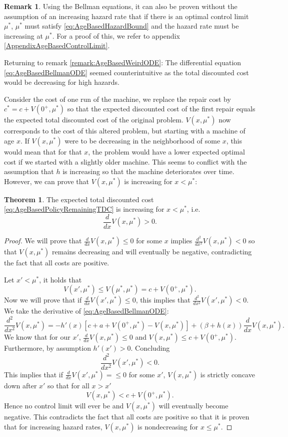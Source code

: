 \documentclass[a4paper]{thesis}
\theoremstyle{definition}
\newtheorem{remark}{Remark}[chapter]
\newtheorem{theorem}{Theorem}[section]
\begin{document}
\begin{remark}
	Using the Bellman equations, it can also be proven without the assumption of an increasing hazard rate that if there is an optimal control limit $\mu^*$, $\mu^*$ must satisfy \eqref{eq:AgeBasedHazardBound} and the hazard rate must be increasing at $\mu^*$.
	For a proof of this, we refer to appendix \ref{AppendixAgeBasedControlLimit}.
\end{remark}

	Returning to remark \ref{remark:AgeBasedWeirdODE}:
	The differential equation \eqref{eq:AgeBasedBellmanODE} seemed counterintuitive as the total discounted cost would be decreasing for high hazards.
	
	Consider the cost of one run of the machine, we replace the repair cost by $c^*=c+V(0^+,\mu^*)$ so that the expected discounted cost of the first repair equals the expected total discounted cost of the original problem.
	$V(x,\mu^*)$ now corresponds to the cost of this altered problem, but starting with a machine of age $x$.
	If $V(x,\mu^*)$ were to be decreasing in the neighborhood of some $x$, this would mean that for that $x$, the problem would have a lower expected optimal cost if we started with a slightly older machine.
	This seems to conflict with the assumption that $h$ is increasing so that the machine deteriorates over time.
	However, we can prove that $V(x,\mu^*)$ is increasing for $x<\mu^*$:

\begin{theorem}\label{theorem:TdcNonDecreasing}
	The expected total discounted cost \eqref{eq:AgeBasedPolicyRemainingTDC} is increasing for $x< \mu^*$, i.e.
	\[
	\frac{d}{dx}V(x,\mu^*)> 0.
	\]
	\begin{proof}
		We will prove that $\frac{d}{dx}V(x,\mu^*)\leq0$ for some $x$ implies $\frac{d^2}{dx^2}V(x,\mu^*)<0$ so that $V(x,\mu^*)$ remains decreasing and will eventually be negative, contradicting the fact that all costs are positive.
		
		Let $x'<\mu^*$, it holds that
		\[
		V(x',\mu^*)\leq V(\mu^*,\mu^*)=c+V(0^+,\mu^*).
		\]
		Now we will prove that if $\frac{d}{dx}V(x',\mu^*)\leq 0$, this implies that $\frac{d^2}{dx^2}V(x',\mu^*)<0$.
		We take the derivative of \eqref{eq:AgeBasedBellmanODE}:
		\[
		\frac{d^2}{dx^2}V(x,\mu^*)=-h'(x)[c+a+V(0^+,\mu^*)-V(x,\mu^*)]+(\beta+h(x))\frac{d}{dx}V(x,\mu^*).
		\]
		We know that for our $x'$, $\frac{d}{dx}V(x,\mu^*)\leq 0$ and $V(x,\mu^*)\leq c+V(0^+,\mu^*)$.
		Furthermore, by assumption $h'(x')>0$.
		Concluding
		\[
		\frac{d^2}{dx^2}V(x',\mu^*)<0.
		\]
		This implies that if $\frac{d}{dx}V(x',\mu^*)=\leq0$ for some $x'$, $V(x,\mu^*)$ is strictly concave down after $x'$ so that for all $x>x'$
		\[
		V(x,\mu^*)< c+V(0^+,\mu^*).
		\]
		Hence no control limit will ever be and $V(x,\mu^*)$ will eventually become negative.
		This contradicts the fact that all costs are positive so that it is proven that for increasing hazard rates, $V(x,\mu^*)$ is nondecreasing for $x\leq\mu^*$.
	\end{proof}
\end{theorem}
\end{document}
